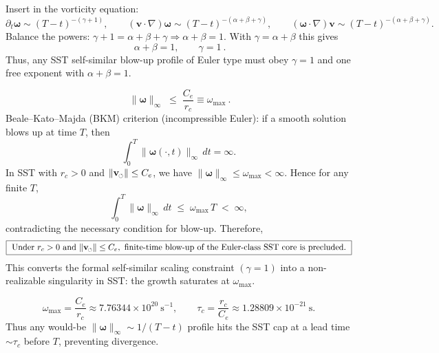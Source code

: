 \documentclass[10pt,reprint,aps,onecolumn,nofootinbib]{revtex4-2}
\newcommand{\vswirl}{\mathbf{v}_{\!\boldsymbol{\circlearrowleft}}}
\newcommand{\vnorm}{\lVert \mathbf{v}_{\mkern-2mu\scriptscriptstyle\boldsymbol{\circlearrowleft}} \rVert}               %
\begin{document}
Insert in the vorticity equation:
\[
    \partial_t \boldsymbol{\omega}\sim (T-t)^{-(\gamma+1)},\qquad
    (\mathbf{v}\!\cdot\!\nabla)\boldsymbol{\omega}\sim (T-t)^{-(\alpha+\beta+\gamma)},\qquad
    (\boldsymbol{\omega}\!\cdot\!\nabla)\mathbf{v}\sim (T-t)^{-(\alpha+\beta+\gamma)} .
\]
Balance the powers: \(\gamma+1=\alpha+\beta+\gamma \Rightarrow \alpha+\beta=1\).
With \(\gamma=\alpha+\beta\) this gives
\[
    \boxed{\ \alpha+\beta=1,\qquad \gamma=1\ } .
\]
Thus, any SST self-similar blow-up profile of Euler type must obey \(\gamma=1\) and one free exponent with \(\alpha+\beta=1\).

\[
    \boxed{\ \lVert \boldsymbol{\omega} \rVert_\infty \;\le\; \frac{C_e}{r_c} \equiv \omega_{\max}\ } .
\]
Beale–Kato–Majda (BKM) criterion (incompressible Euler): if a smooth solution blows up at time \(T\), then
\[
    \int_0^T \lVert \boldsymbol{\omega}(\cdot,t) \rVert_\infty \, dt = \infty .
\]
In SST with \(r_c>0\) and \(\vnorm\le C_e\), we have \(\lVert \boldsymbol{\omega}\rVert_\infty\le \omega_{\max}<\infty\).
Hence for any finite \(T\),
\[
    \int_0^T \lVert \boldsymbol{\omega} \rVert_\infty \, dt \;\le\; \omega_{\max}\,T \;<\;\infty,
\]
contradicting the necessary condition for blow-up. Therefore,
\[
    \boxed{\ \text{Under } r_c>0 \text{ and } \vnorm\le C_e,\ \text{finite-time blow-up of the Euler-class SST core is precluded.}\ }
\]
This converts the formal self-similar scaling constraint \((\gamma=1)\) into a non-realizable singularity in SST: the growth saturates at \(\omega_{\max}\).

\[
    \omega_{\max}=\frac{C_e}{r_c}\approx 7.76344\times 10^{20}\ \mathrm{s^{-1}},\qquad
    \tau_c=\frac{r_c}{C_e}\approx 1.28809\times 10^{-21}\ \mathrm{s}.
\]
Thus any would-be \( \lVert\boldsymbol{\omega}\rVert_\infty\sim 1/(T-t) \) profile hits the SST cap at a lead time \(\sim \tau_c\) before \(T\), preventing divergence.
\end{document}
